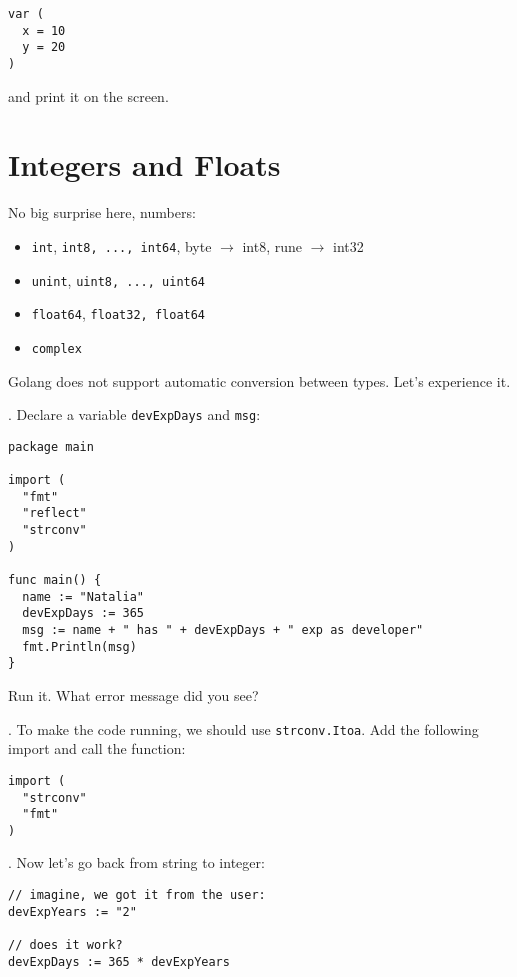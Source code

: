 \documentclass[11pt, letterpaper]{article}
\begin{document}
\begin{verbatim}
var (
  x = 10
  y = 20
)
\end{verbatim}

and print it on the screen.

\section{Integers and Floats}

No big surprise here, numbers:

\begin{itemize}
\item \verb|int|, \verb|int8, ..., int64|, byte $\rightarrow$ int8, rune $\rightarrow$ int32
\item \verb|unint|, \verb|uint8, ..., uint64|
\item \verb|float64|, \verb|float32, float64|
\item \verb|complex|
\end{itemize}

Golang does not support automatic conversion between types. Let's experience it.

. Declare a variable \texttt{devExpDays} and \texttt{msg}:

\begin{verbatim}
package main

import (
  "fmt"
  "reflect"
  "strconv"
)

func main() {
  name := "Natalia"
  devExpDays := 365
  msg := name + " has " + devExpDays + " exp as developer"
  fmt.Println(msg)
}
\end{verbatim}

Run it. What error message did you see?

. To make the code running, we should use \texttt{strconv.Itoa}. Add the following import and call the function:

\begin{verbatim}
import (
  "strconv"
  "fmt"
)
\end{verbatim}

. Now let's go back from string to integer:

\begin{verbatim}
// imagine, we got it from the user:
devExpYears := "2"

// does it work?
devExpDays := 365 * devExpYears
\end{verbatim}
\end{document}
